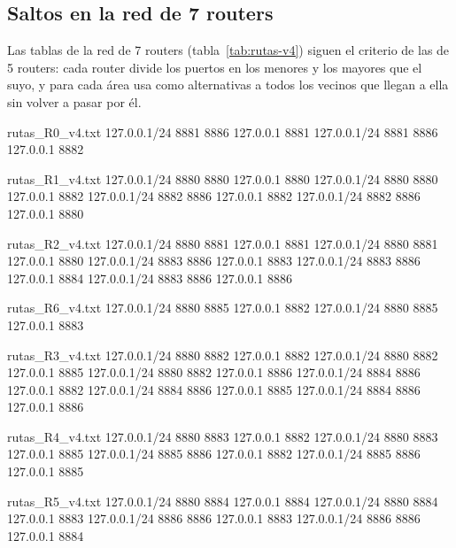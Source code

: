 \documentclass[
	spanish, %
	letterpaper, oneside
]{article}
\begin{document}
\subsection{Saltos en la red de 7 routers}
\label{sec:saltos-7}
Las tablas de la red de 7 routers (tabla~\ref{tab:rutas-v4}) siguen el criterio de las de 5 routers: cada router divide los puertos en los menores y los mayores que el suyo, y para cada área usa como alternativas a todos los vecinos que llegan a ella sin volver a pasar por él.

\begin{table}[ht]
	\centering
	\caption{Tablas de rutas de la red de 7 routers.}
	\label{tab:rutas-v4}
	\begin{minipage}[t]{0.49\textwidth}
\begin{salida}
rutas_R0_v4.txt
127.0.0.1/24 8881 8886 127.0.0.1 8881
127.0.0.1/24 8881 8886 127.0.0.1 8882

rutas_R1_v4.txt
127.0.0.1/24 8880 8880 127.0.0.1 8880
127.0.0.1/24 8880 8880 127.0.0.1 8882
127.0.0.1/24 8882 8886 127.0.0.1 8882
127.0.0.1/24 8882 8886 127.0.0.1 8880

rutas_R2_v4.txt
127.0.0.1/24 8880 8881 127.0.0.1 8881
127.0.0.1/24 8880 8881 127.0.0.1 8880
127.0.0.1/24 8883 8886 127.0.0.1 8883
127.0.0.1/24 8883 8886 127.0.0.1 8884
127.0.0.1/24 8883 8886 127.0.0.1 8886

rutas_R6_v4.txt
127.0.0.1/24 8880 8885 127.0.0.1 8882
127.0.0.1/24 8880 8885 127.0.0.1 8883
\end{salida}
	\end{minipage}\hfill
	\begin{minipage}[t]{0.49\textwidth}
\begin{salida}
rutas_R3_v4.txt
127.0.0.1/24 8880 8882 127.0.0.1 8882
127.0.0.1/24 8880 8882 127.0.0.1 8885
127.0.0.1/24 8880 8882 127.0.0.1 8886
127.0.0.1/24 8884 8886 127.0.0.1 8882
127.0.0.1/24 8884 8886 127.0.0.1 8885
127.0.0.1/24 8884 8886 127.0.0.1 8886

rutas_R4_v4.txt
127.0.0.1/24 8880 8883 127.0.0.1 8882
127.0.0.1/24 8880 8883 127.0.0.1 8885
127.0.0.1/24 8885 8886 127.0.0.1 8882
127.0.0.1/24 8885 8886 127.0.0.1 8885

rutas_R5_v4.txt
127.0.0.1/24 8880 8884 127.0.0.1 8884
127.0.0.1/24 8880 8884 127.0.0.1 8883
127.0.0.1/24 8886 8886 127.0.0.1 8883
127.0.0.1/24 8886 8886 127.0.0.1 8884
\end{salida}
	\end{minipage}
\end{table}
\end{document}
